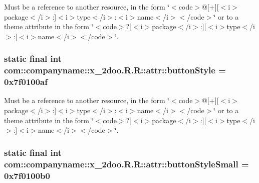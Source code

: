 Must be a reference to another resource, in the form \char`\"{}$<$code$>$@\mbox{[}+\mbox{]}\mbox{[}$<$i$>$package$<$/i$>$:\mbox{]}$<$i$>$type$<$/i$>$:$<$i$>$name$<$/i$>$$<$/code$>$\char`\"{} or to a theme attribute in the form \char`\"{}$<$code$>$?\mbox{[}$<$i$>$package$<$/i$>$:\mbox{]}\mbox{[}$<$i$>$type$<$/i$>$:\mbox{]}$<$i$>$name$<$/i$>$$<$/code$>$\char`\"{}. \hypertarget{classcom_1_1companyname_1_1x__2doo_1_1_r_1_1attr_31a5d6dfc676aac5605feadd0269e3bc}{
\subsubsection[{buttonStyle}]{\setlength{\rightskip}{0pt plus 5cm}static final int com::companyname::x\_\-2doo.R.R::attr::buttonStyle = 0x7f0100af}}
\label{classcom_1_1companyname_1_1x__2doo_1_1_r_1_1attr_31a5d6dfc676aac5605feadd0269e3bc}


Must be a reference to another resource, in the form \char`\"{}$<$code$>$@\mbox{[}+\mbox{]}\mbox{[}$<$i$>$package$<$/i$>$:\mbox{]}$<$i$>$type$<$/i$>$:$<$i$>$name$<$/i$>$$<$/code$>$\char`\"{} or to a theme attribute in the form \char`\"{}$<$code$>$?\mbox{[}$<$i$>$package$<$/i$>$:\mbox{]}\mbox{[}$<$i$>$type$<$/i$>$:\mbox{]}$<$i$>$name$<$/i$>$$<$/code$>$\char`\"{}. \hypertarget{classcom_1_1companyname_1_1x__2doo_1_1_r_1_1attr_182869530f662cd82b6091bfa78309dc}{
\subsubsection[{buttonStyleSmall}]{\setlength{\rightskip}{0pt plus 5cm}static final int com::companyname::x\_\-2doo.R.R::attr::buttonStyleSmall = 0x7f0100b0}}
\label{classcom_1_1companyname_1_1x__2doo_1_1_r_1_1attr_182869530f662cd82b6091bfa78309dc}


